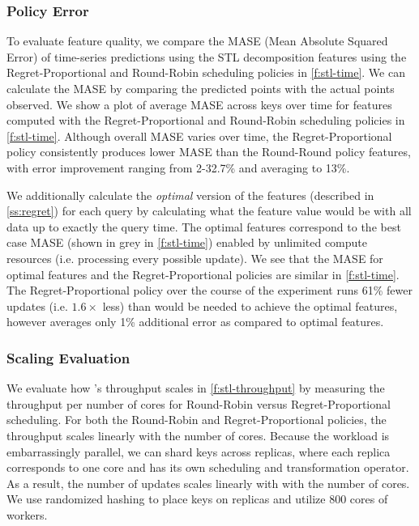 \subsubsection{Policy Error}
To evaluate feature quality, we compare the MASE (Mean Absolute Squared Error) of time-series predictions using the STL decomposition features using the Regret-Proportional and Round-Robin scheduling policies in \cref{f:stl-time}. We can calculate the MASE by comparing the predicted points with the actual points observed. We show a plot of average MASE across keys over time for features computed with the Regret-Proportional and Round-Robin scheduling policies in \cref{f:stl-time}.  Although overall MASE varies over time, the Regret-Proportional policy consistently produces lower MASE than the Round-Round policy features, with error improvement ranging from 2-32.7\% and averaging to 13\%.

We additionally calculate the \textit{optimal} version of the features (described in \cref{ss:regret}) for each query by calculating what the feature value would be with all data up to exactly the query time. The optimal features correspond to the best case MASE (shown in grey in \cref{f:stl-time}) enabled by unlimited compute resources (i.e. processing every possible update). We see that the MASE for optimal features and the Regret-Proportional policies are similar in \cref{f:stl-time}. The Regret-Proportional policy over the course of the experiment runs 61\% fewer updates (i.e. $1.6\times$ less) than would be needed to achieve the optimal features, however averages only 1\% additional error as compared to optimal features. 


\subsubsection{Scaling Evaluation}
We evaluate how \system{}'s throughput scales in  \cref{f:stl-throughput} by measuring the throughput per number of cores for Round-Robin versus Regret-Proportional scheduling. For both the Round-Robin and Regret-Proportional policies, the throughput scales linearly with the number of cores. Because the workload is embarrassingly parallel, we can shard keys across replicas, where each replica corresponds to one core and has its own scheduling and transformation operator. As a result, the number of updates scales linearly with with the number of cores. We use randomized hashing to place keys on replicas and utilize 800 cores of workers.

